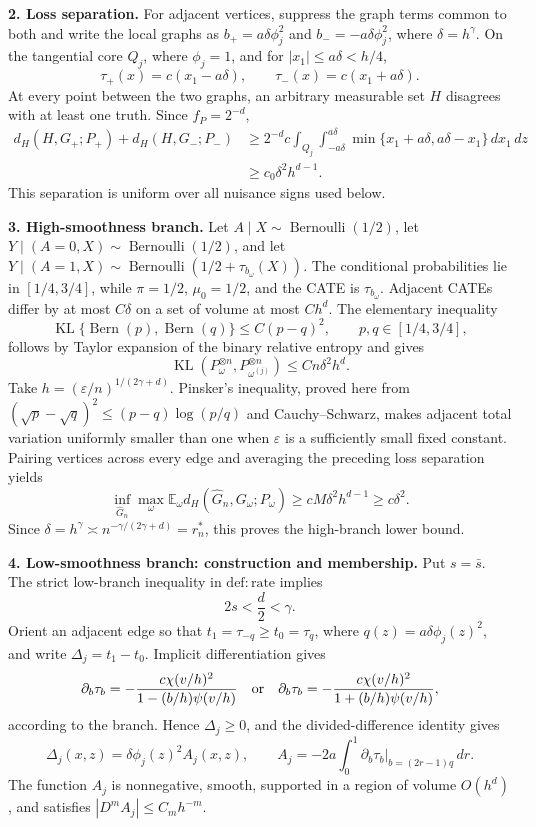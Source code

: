 \textbf{2. Loss separation.} For adjacent vertices, suppress the graph terms common to both and write the local graphs as \(b_+=a\delta\phi_j^2\) and \(b_-=-a\delta\phi_j^2\), where \(\delta=h^\gamma\). On the tangential core \(Q_j\), where \(\phi_j=1\), and for \(|x_1|\le a\delta<h/4\),
\[
\tau_+(x)=c(x_1-a\delta),
\qquad
\tau_-(x)=c(x_1+a\delta).
\]
At every point between the two graphs, an arbitrary measurable set \(H\) disagrees with at least one truth. Since \(f_P=2^{-d}\),
\[
\begin{aligned}
d_H(H,G_+;P_+)+d_H(H,G_-;P_-)
&\ge2^{-d}c\int_{Q_j}\int_{-a\delta}^{a\delta}
\min\{x_1+a\delta,a\delta-x_1\}\,dx_1\,dz\\
&\ge c_0\delta^2h^{d-1}.
\end{aligned}
\]
This separation is uniform over all nuisance signs used below.

\textbf{3. High-smoothness branch.} Let \(A\mid X\sim\operatorname{Bernoulli}(1/2)\), let \(Y\mid(A=0,X)\sim\operatorname{Bernoulli}(1/2)\), and let \(Y\mid(A=1,X)\sim\operatorname{Bernoulli}(1/2+\tau_{b_\omega}(X))\). The conditional probabilities lie in \([1/4,3/4]\), while \(\pi=1/2\), \(\mu_0=1/2\), and the CATE is \(\tau_{b_\omega}\). Adjacent CATEs differ by at most \(C\delta\) on a set of volume at most \(Ch^d\). The elementary inequality
\[
\operatorname{KL}\{\operatorname{Bern}(p),\operatorname{Bern}(q)\}
\le C(p-q)^2,
\qquad p,q\in[1/4,3/4],
\]
follows by Taylor expansion of the binary relative entropy and gives
\[
\operatorname{KL}(P_\omega^{\otimes n},P_{\omega^{(j)}}^{\otimes n})
\le Cn\delta^2h^d.
\]
Take \(h=(\varepsilon/n)^{1/(2\gamma+d)}\). Pinsker's inequality, proved here from \((\sqrt p-\sqrt q)^2\le(p-q)\log(p/q)\) and Cauchy--Schwarz, makes adjacent total variation uniformly smaller than one when \(\varepsilon\) is a sufficiently small fixed constant. Pairing vertices across every edge and averaging the preceding loss separation yields
\[
\inf_{\widehat G_n}\max_\omega
\mathbb E_\omega d_H(\widehat G_n,G_\omega;P_\omega)
\ge cM\delta^2h^{d-1}\ge c\delta^2.
\]
Since \(\delta=h^\gamma\asymp n^{-\gamma/(2\gamma+d)}=r_n^*\), this proves the high-branch lower bound.

\textbf{4. Low-smoothness branch: construction and membership.} Put \(s=\bar s\). The strict low-branch inequality in \(\mathrm{def:rate}\) implies
\[
2s<\frac d2<\gamma.
\]
Orient an adjacent edge so that \(t_1=\tau_{-q}\ge t_0=\tau_q\), where \(q(z)=a\delta\phi_j(z)^2\), and write \(\Delta_j=t_1-t_0\). Implicit differentiation gives
\[
\partial_b\tau_b=-\frac{c\chi(v/h)^2}{1-(b/h)\psi(v/h)}
\quad\hbox{or}\quad
\partial_b\tau_b=-\frac{c\chi(v/h)^2}{1+(b/h)\psi(v/h)},
\]
according to the branch. Hence \(\Delta_j\ge0\), and the divided-difference identity gives
\[
\Delta_j(x,z)=\delta\phi_j(z)^2A_j(x,z),
\qquad
A_j=-2a\int_0^1\left.\partial_b\tau_b\right|_{b=(2r-1)q}\,dr.
\]
The function \(A_j\) is nonnegative, smooth, supported in a region of volume \(O(h^d)\), and satisfies \(|D^mA_j|\le C_mh^{-m}\).


